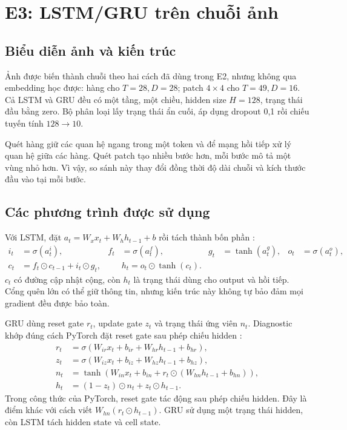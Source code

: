 \documentclass[12pt,a4paper]{report}
\begin{document}
\chapter{E3: LSTM/GRU trên chuỗi ảnh}
\section{Biểu diễn ảnh và kiến trúc}
Ảnh được biến thành chuỗi theo hai cách đã dùng trong E2, nhưng không qua embedding học được: hàng cho $T=28,D=28$; patch $4\times4$ cho $T=49,D=16$. Cả LSTM và GRU đều có một tầng, một chiều, hidden size $H=128$, trạng thái đầu bằng zero. Bộ phân loại lấy trạng thái ẩn cuối, áp dụng dropout 0,1 rồi chiếu tuyến tính $128\to10$.

Quét hàng giữ các quan hệ ngang trong một token và để mạng hồi tiếp xử lý quan hệ giữa các hàng. Quét patch tạo nhiều bước hơn, mỗi bước mô tả một vùng nhỏ hơn. Vì vậy, so sánh này thay đổi đồng thời độ dài chuỗi và kích thước đầu vào tại mỗi bước.

\section{Các phương trình được sử dụng}
Với LSTM, đặt $a_t=W_xx_t+W_hh_{t-1}+b$ rồi tách thành bốn phần \cite{pytorch-lstm}:
\begin{align}
i_t&=\sigma(a_t^i),& f_t&=\sigma(a_t^f),& g_t&=\tanh(a_t^g),& o_t&=\sigma(a_t^o),\\
c_t&=f_t\odot c_{t-1}+i_t\odot g_t,&&
h_t=o_t\odot\tanh(c_t).
\end{align}
$c_t$ có đường cập nhật cộng, còn $h_t$ là trạng thái dùng cho output và hồi tiếp. Cổng quên lớn có thể giữ thông tin, nhưng kiến trúc này không tự bảo đảm mọi gradient đều được bảo toàn.

GRU dùng reset gate $r_t$, update gate $z_t$ và trạng thái ứng viên $n_t$. Diagnostic khớp đúng cách PyTorch đặt reset gate sau phép chiếu hidden \cite{pytorch-gru}:
\begin{align}
r_t &=\sigma(W_{ir}x_t+b_{ir}+W_{hr}h_{t-1}+b_{hr}),\\
z_t &=\sigma(W_{iz}x_t+b_{iz}+W_{hz}h_{t-1}+b_{hz}),\\
n_t &=\tanh\!\left(W_{in}x_t+b_{in}+r_t\odot(W_{hn}h_{t-1}+b_{hn})\right),\\
h_t &=(1-z_t)\odot n_t+z_t\odot h_{t-1}.
\end{align}
Trong công thức của PyTorch, reset gate tác động sau phép chiếu hidden. Đây là điểm khác với cách viết $W_{hn}(r_t\odot h_{t-1})$. GRU sử dụng một trạng thái hidden, còn LSTM tách hidden state và cell state.
\end{document}
